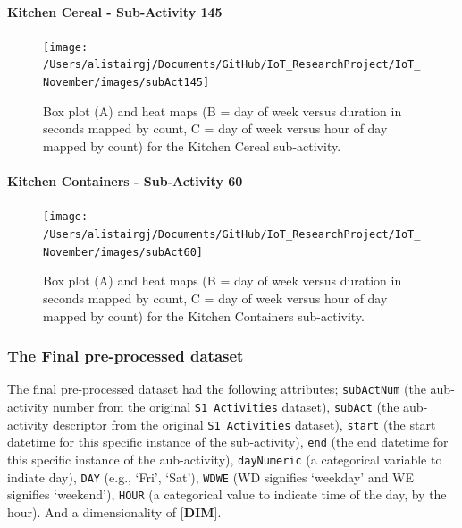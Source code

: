 \documentclass[11pt,]{article}
\let\oldparagraph\paragraph
\renewcommand{\paragraph}[1]{\oldparagraph{#1}\mbox{}}
\begin{document}
\hypertarget{kitchen-cereal---sub-activity-145}{%
\paragraph{Kitchen Cereal - Sub-Activity
145}\label{kitchen-cereal---sub-activity-145}}

\begin{figure}[H]

{\centering \texttt{[image: /Users/alistairgj/Documents/GitHub/IoT\_ResearchProject/IoT\_November/images/subAct145]} 

}

\caption{Box plot (A) and heat maps (B = day of week versus duration in seconds mapped by count, C = day of week versus hour of day mapped by count) for the Kitchen Cereal sub-activity.}\label{fig:subAct145}
\end{figure}

\hypertarget{kitchen-containers---sub-activity-60}{%
\paragraph{Kitchen Containers - Sub-Activity
60}\label{kitchen-containers---sub-activity-60}}

\begin{figure}[H]

{\centering \texttt{[image: /Users/alistairgj/Documents/GitHub/IoT\_ResearchProject/IoT\_November/images/subAct60]} 

}

\caption{Box plot (A) and heat maps (B = day of week versus duration in seconds mapped by count, C = day of week versus hour of day mapped by count) for the Kitchen Containers sub-activity.}\label{fig:subAct60}
\end{figure}

\hypertarget{the-final-pre-processed-dataset}{%
\subsubsection{The Final pre-processed
dataset}\label{the-final-pre-processed-dataset}}

The final pre-processed dataset had the following attributes;
\texttt{subActNum} (the aub-activity number from the original
\texttt{S1\ Activities} dataset), \texttt{subAct} (the aub-activity
descriptor from the original \texttt{S1\ Activities} dataset),
\texttt{start} (the start datetime for this specific instance of the
sub-activity), \texttt{end} (the end datetime for this specific instance
of the aub-activity), \texttt{dayNumeric} (a categorical variable to
indiate day), \texttt{DAY} (e.g., `Fri', `Sat'), \texttt{WDWE} (WD
signifies `weekday' and WE signifies `weekend'), \texttt{HOUR} (a
categorical value to indicate time of the day, by the hour). And a
dimensionality of {[}\textbf{DIM}{]}.
\end{document}
